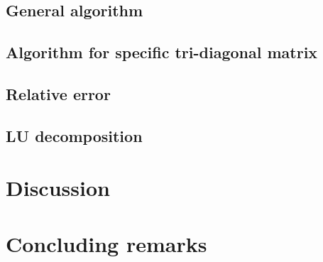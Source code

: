 \documentclass[norsk,a4paper,12pt]{article}
\begin{document}
\subsection{General algorithm}

\subsection{Algorithm for specific tri-diagonal matrix}

 \subsection{Relative error}
 
  \subsection{LU decomposition}
  
  \section{Discussion}
  
  


\section{Concluding remarks}


\end{document}
